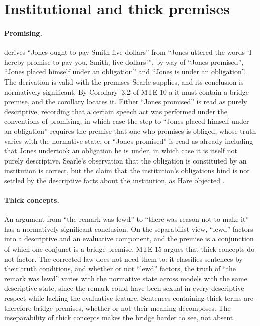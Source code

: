 \documentclass{situationist-preprint}
\begin{document}
\section{Institutional and thick premises}

\paragraph{Promising.} \citet{Searle1964} derives \enquote{Jones ought to pay Smith five dollars} from \enquote{Jones uttered the words \enquote{I hereby promise to pay you, Smith, five dollars}}, by way of \enquote{Jones promised}, \enquote{Jones placed himself under an obligation} and \enquote{Jones is under an obligation}. The derivation is valid with the premises Searle supplies, and its conclusion is normatively significant. By Corollary~3.2 of MTE-10-a it must contain a bridge premise, and the corollary locates it. Either \enquote{Jones promised} is read as purely descriptive, recording that a certain speech act was performed under the conventions of promising, in which case the step to \enquote{Jones placed himself under an obligation} requires the premise that one who promises is obliged, whose truth varies with the normative state; or \enquote{Jones promised} is read as already including that Jones undertook an obligation he is under, in which case it is itself not purely descriptive. Searle's observation that the obligation is constituted by an institution is correct, but the claim that the institution's obligations bind is not settled by the descriptive facts about the institution, as Hare objected \citep{Hare1964}.

\paragraph{Thick concepts.} An argument from \enquote{the remark was lewd} to \enquote{there was reason not to make it} has a normatively significant conclusion. On the separabilist view, \enquote{lewd} factors into a descriptive and an evaluative component, and the premise is a conjunction of which one conjunct is a bridge premise. MTE-15 argues that thick concepts do not factor. The corrected law does not need them to: it classifies sentences by their truth conditions, and whether or not \enquote{lewd} factors, the truth of \enquote{the remark was lewd} varies with the normative state across models with the same descriptive state, since the remark could have been sexual in every descriptive respect while lacking the evaluative feature. Sentences containing thick terms are therefore bridge premises, whether or not their meaning decomposes. The inseparability of thick concepts makes the bridge harder to see, not absent.
\end{document}
